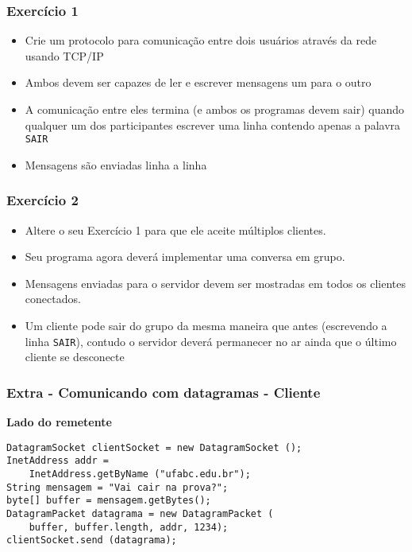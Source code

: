 \documentclass[Ligatures=TeX,table,brazil,svgnames,usetotalslideindicator,comp
ress,10pt]{beamer}
\begin{document}
\begin{frame}
  \frametitle{Exercício 1}
  \begin{itemize}
    \item Crie um protocolo para comunicação entre dois usuários através
      da rede usando TCP/IP
    \item Ambos devem ser capazes de ler e escrever mensagens um para
      o outro
    \item A comunicação entre eles termina (e ambos os programas devem
      sair) quando qualquer um dos participantes escrever uma linha
      contendo apenas a palavra \texttt{SAIR}
    \item Mensagens são enviadas linha a linha
  \end{itemize}
\end{frame}

\begin{frame}
  \frametitle{Exercício 2}
  \begin{itemize}
    \item Altere o seu Exercício 1 para que ele aceite múltiplos clientes.
    \item Seu programa agora deverá implementar uma conversa em grupo.
    \item Mensagens enviadas para o servidor devem ser mostradas em
      todos os clientes conectados.
    \item Um cliente pode sair do grupo da mesma maneira que antes
      (escrevendo a linha \texttt{SAIR}), contudo o servidor deverá
      permanecer no ar ainda que o último cliente se desconecte
  \end{itemize}
\end{frame}

\begin{frame}[fragile]
  \frametitle{Extra - Comunicando com datagramas - Cliente}

  \textbf{\alert{Lado do remetente}}

\begin{verbatim}
DatagramSocket clientSocket = new DatagramSocket ();
InetAddress addr =
    InetAddress.getByName ("ufabc.edu.br");
String mensagem = "Vai cair na prova?";
byte[] buffer = mensagem.getBytes();
DatagramPacket datagrama = new DatagramPacket (
    buffer, buffer.length, addr, 1234);
clientSocket.send (datagrama);
\end{verbatim}

\end{frame}
\end{document}
